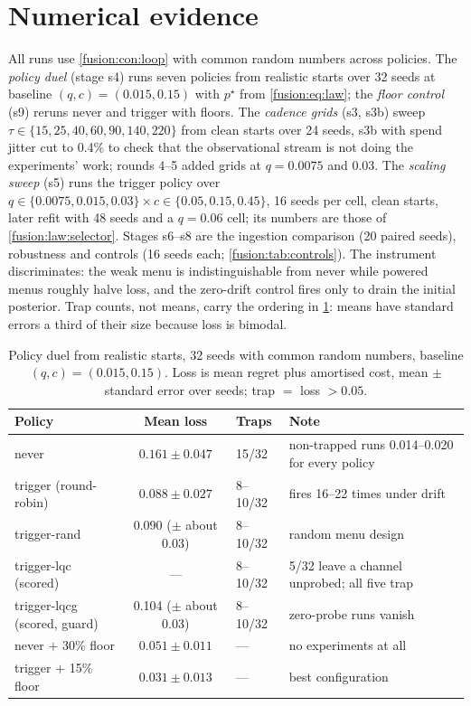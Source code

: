 \section{Numerical evidence}
\label{fusion:sec:numerics}

All runs use \cref{fusion:con:loop} with common random numbers across policies. The \emph{policy duel} (stage s4) runs seven policies from realistic starts over 32 seeds at baseline $(q,c) = (0.015, 0.15)$ with $p^\star$ from \cref{fusion:eq:law}; the \emph{floor control} (s9) reruns never and trigger with floors. The \emph{cadence grids} (s3, s3b) sweep $\tau \in \{15, 25, 40, 60, 90, 140, 220\}$ from clean starts over 24 seeds, s3b with spend jitter cut to 0.4\% to check that the observational stream is not doing the experiments' work; rounds 4--5 added grids at $q = 0.0075$ and $0.03$. The \emph{scaling sweep} (s5) runs the trigger policy over $q \in \{0.0075, 0.015, 0.03\} \times c \in \{0.05, 0.15, 0.45\}$, 16 seeds per cell, clean starts, later refit with 48 seeds and a $q = 0.06$ cell; its numbers are those of \cref{fusion:law:selector}. Stages s6--s8 are the ingestion comparison (20 paired seeds), robustness and controls (16 seeds each; \cref{fusion:tab:controls}). The instrument discriminates: the weak menu is indistinguishable from never while powered menus roughly halve loss, and the zero-drift control fires only to drain the initial posterior. Trap counts, not means, carry the ordering in \cref{fusion:tab:duel}: means have standard errors a third of their size because loss is bimodal.

\begin{table}[htbp]
\centering\small
\caption{Policy duel from realistic starts, 32 seeds with common random numbers, baseline $(q,c) = (0.015, 0.15)$. Loss is mean regret plus amortised cost, mean $\pm$ standard error over seeds; trap $=$ loss $> 0.05$.}
\label{fusion:tab:duel}
\begin{tabularx}{\textwidth}{lclX}
\toprule
Policy & Mean loss & Traps & Note \\
\midrule
never & $0.161 \pm 0.047$ & 15/32 & non-trapped runs 0.014--0.020 for every policy \\
trigger (round-robin) & $0.088 \pm 0.027$ & 8--10/32 & fires 16--22 times under drift \\
trigger-rand & 0.090 ($\pm$ about 0.03) & 8--10/32 & random menu design \\
trigger-lqc (scored) & --- & 8--10/32 & 5/32 leave a channel unprobed; all five trap \\
trigger-lqcg (scored, guard) & 0.104 ($\pm$ about 0.03) & 8--10/32 & zero-probe runs vanish \\
never $+$ 30\% floor & $0.051 \pm 0.011$ & --- & no experiments at all \\
trigger $+$ 15\% floor & $0.031 \pm 0.013$ & --- & best configuration \\
\bottomrule
\end{tabularx}
\end{table}

